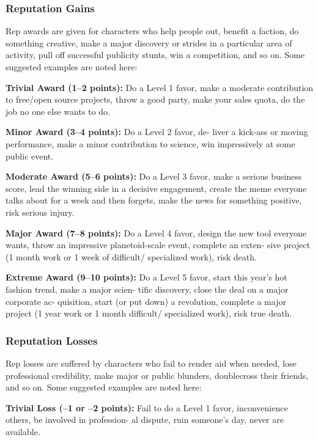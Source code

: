 \subsubsection{Reputation Gains}

Rep awards are given for characters who help people 
out, benefit a faction, do something creative, make 
a major discovery or strides in a particular area of 
activity, pull off successful publicity stunts, win a 
competition, and so on. Some suggested examples are 
noted here:

\textbf{Trivial Award (1–2 points):} Do a Level 1 favor, 
make a moderate contribution to free/open source 
projects, throw a good party, make your sales quota, 
do the job no one else wants to do. 

\textbf{Minor Award (3–4 points):} Do a Level 2 favor, de-
liver a kick-ass or moving performance, make a minor 
contribution to science, win impressively at some 
public event.

\textbf{Moderate Award (5–6 points):} Do a Level 3 favor, 
make a serious business score, lead the winning side 
in a decisive engagement, create the meme everyone 
talks about for a week and then forgets, make the 
news for something positive, risk serious injury.

\textbf{Major Award (7–8 points):} Do a Level 4 favor, 
design the new tool everyone wants, throw an 
impressive planetoid-scale event, complete an exten-
sive project (1 month work or 1 week of difficult/
specialized work), risk death.

\textbf{Extreme Award (9–10 points):} Do a Level 5 favor, 
start this year's hot fashion trend, make a major scien-
tific discovery, close the deal on a major corporate ac-
quisition, start (or put down) a revolution, complete 
a major project (1 year work or 1 month difficult/
specialized work), risk true death.

\subsubsection{Reputation Losses}

Rep losses are suffered by characters who fail to render 
aid when needed, lose professional credibility, make 
major or public blunders, doublecross their friends, 
and so on. Some suggested examples are noted here:

\textbf{Trivial Loss (–1 or –2 points):} Fail to do a Level 1 
favor, inconvenience others, be involved in profession-
al dispute, ruin someone's day, never are available.

